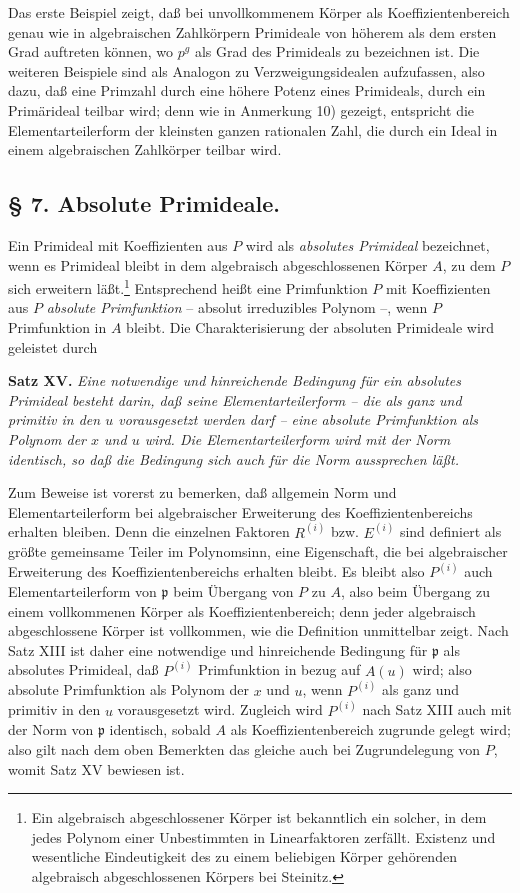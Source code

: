 \documentclass[11pt]{article}
\providecommand{\frakp}{\mathfrak p}
\begin{document}
Das erste Beispiel zeigt, daß bei unvollkommenem Körper als Koeffizientenbereich genau wie in algebraischen Zahlkörpern Primideale von höherem als dem ersten Grad auftreten können, wo $p^g$ als Grad des Primideals zu bezeichnen ist. Die weiteren Beispiele sind als Analogon zu Verzweigungsidealen aufzufassen, also dazu, daß eine Primzahl durch eine höhere Potenz eines Primideals, durch ein Primärideal teilbar wird; denn wie in Anmerkung 10) gezeigt, entspricht die Elementarteilerform der kleinsten ganzen rationalen Zahl, die durch ein Ideal in einem algebraischen Zahlkörper teilbar wird.

\subsection*{§ 7. Absolute Primideale.}

Ein Primideal mit Koeffizienten aus $P$ wird als \emph{absolutes Primideal} bezeichnet, wenn es Primideal bleibt in dem algebraisch abgeschlossenen Körper $A$, zu dem $P$ sich erweitern läßt.\footnote{Ein algebraisch abgeschlossener Körper ist bekanntlich ein solcher, in dem jedes Polynom einer Unbestimmten in Linearfaktoren zerfällt. Existenz und wesentliche Eindeutigkeit des zu einem beliebigen Körper gehörenden algebraisch abgeschlossenen Körpers bei Steinitz.} Entsprechend heißt eine Primfunktion $P$ mit Koeffizienten aus $P$ \emph{absolute Primfunktion} -- absolut irreduzibles Polynom --, wenn $P$ Primfunktion in $A$ bleibt. Die Charakterisierung der absoluten Primideale wird geleistet durch

\textbf{Satz XV.} \emph{Eine notwendige und hinreichende Bedingung für ein absolutes Primideal besteht darin, daß seine Elementarteilerform -- die als ganz und primitiv in den $u$ vorausgesetzt werden darf -- eine absolute Primfunktion als Polynom der $x$ und $u$ wird. Die Elementarteilerform wird mit der Norm identisch, so daß die Bedingung sich auch für die Norm aussprechen läßt.}

Zum Beweise ist vorerst zu bemerken, daß allgemein Norm und Elementarteilerform bei algebraischer Erweiterung des Koeffizientenbereichs erhalten bleiben. Denn die einzelnen Faktoren $R^{(i)}$ bzw. $E^{(i)}$ sind definiert als größte gemeinsame Teiler im Polynomsinn, eine Eigenschaft, die bei algebraischer Erweiterung des Koeffizientenbereichs erhalten bleibt. Es bleibt also $P^{(i)}$ auch Elementarteilerform von $\frakp$ beim Übergang von $P$ zu $A$, also beim Übergang zu einem vollkommenen Körper als Koeffizientenbereich; denn jeder algebraisch abgeschlossene Körper ist vollkommen, wie die Definition unmittelbar zeigt. Nach Satz XIII ist daher eine notwendige und hinreichende Bedingung für $\frakp$ als absolutes Primideal, daß $P^{(i)}$ Primfunktion in bezug auf $A(u)$ wird; also absolute Primfunktion als Polynom der $x$ und $u$, wenn $P^{(i)}$ als ganz und primitiv in den $u$ vorausgesetzt wird. Zugleich wird $P^{(i)}$ nach Satz XIII auch mit der Norm von $\frakp$ identisch, sobald $A$ als Koeffizientenbereich zugrunde gelegt wird; also gilt nach dem oben Bemerkten das gleiche auch bei Zugrundelegung von $P$, womit Satz XV bewiesen ist.
\end{document}
